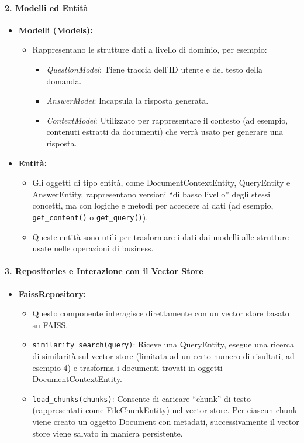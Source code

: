     \paragraph{2. Modelli ed Entità}
    \begin{itemize}
        \item \textbf{Modelli (Models):}
        \begin{itemize}
            \item Rappresentano le strutture dati a livello di dominio, per esempio:
            \begin{itemize}
                \item \textit{QuestionModel}: Tiene traccia dell’ID utente e del testo della domanda.
                \item \textit{AnswerModel}: Incapsula la risposta generata.
                \item \textit{ContextModel}: Utilizzato per rappresentare il contesto (ad esempio, contenuti estratti da documenti) che verrà usato per generare una risposta.
            \end{itemize}
        \end{itemize}
        \item \textbf{Entità:}
        \begin{itemize}
            \item Gli oggetti di tipo entità, come DocumentContextEntity, QueryEntity e AnswerEntity, rappresentano versioni “di basso livello” degli stessi concetti, ma con logiche e metodi per accedere ai dati (ad esempio, \texttt{get\_content()} o \texttt{get\_query()}).
            \item Queste entità sono utili per trasformare i dati dai modelli alle strutture usate nelle operazioni di business.
        \end{itemize}
    \end{itemize}

    \paragraph{3. Repositories e Interazione con il Vector Store}
    \begin{itemize}
        \item \textbf{FaissRepository:}
        \begin{itemize}
            \item Questo componente interagisce direttamente con un vector store basato su FAISS.
            \item \texttt{similarity\_search(query)}: Riceve una QueryEntity, esegue una ricerca di similarità sul vector store (limitata ad un certo numero di risultati, ad esempio 4) e trasforma i documenti trovati in oggetti DocumentContextEntity.
            \item \texttt{load\_chunks(chunks)}: Consente di caricare “chunk” di testo (rappresentati come FileChunkEntity) nel vector store. Per ciascun chunk viene creato un oggetto Document con metadati, successivamente il vector store viene salvato in maniera persistente.
        \end{itemize}
    \end{itemize}

